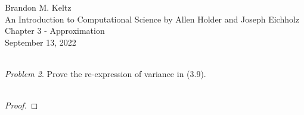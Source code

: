 \documentclass{article}
\begin{document}
	\begin{flushleft}

		Brandon M. Keltz\\
		An Introduction to Computational Science by Allen Holder and Joseph Eichholz\\
		Chapter 3 - Approximation\\
		September 13, 2022\\\

		\textit{Problem 2}. Prove the re-expression of variance in (3.9). \\\

		\begin{proof}

			

		\end{proof}

	\end{flushleft}
\end{document}
